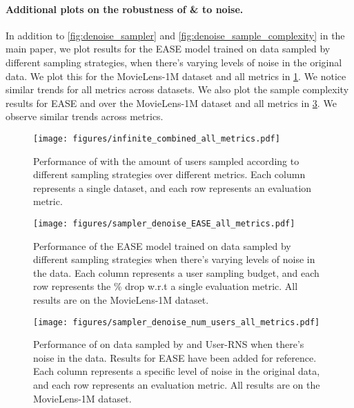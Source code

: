 \documentclass{article}
\begin{document}
\paragraph{Additional plots on the robustness of \sampler \& \model to noise.} In addition to \cref{fig:denoise_sampler} and \cref{fig:denoise_sample_complexity} in the main paper, we plot results for the EASE model trained on data sampled by different sampling strategies, when there's varying levels of noise in the original data. We plot this for the MovieLens-1M dataset and all metrics in \cref{fig:inf_ae_sampling_all_metrics}. We notice similar trends for all metrics across datasets. We also plot the sample complexity results for EASE and \model over the MovieLens-1M dataset and all metrics in \cref{fig:denoise_sample_complexity_all_metrics}. We observe similar trends across metrics.

\begin{figure}[ht!] 
    \texttt{[image: figures/infinite\_combined\_all\_metrics.pdf]}
    \caption{Performance of \model with the amount of users sampled according to different sampling strategies over different metrics. Each column represents a single dataset, and each row represents an evaluation metric.}
    \label{fig:inf_ae_sampling_all_metrics}
\end{figure}

\begin{figure}[ht!] 
    \texttt{[image: figures/sampler\_denoise\_EASE\_all\_metrics.pdf]}
    \caption{Performance of the EASE model trained on data sampled by different sampling strategies when there's varying levels of noise in the data. Each column represents a user sampling budget, and each row represents the \% drop w.r.t a single evaluation metric. All results are on the MovieLens-1M dataset.}
    \label{fig:denoise_sampler_all_metrics}
\end{figure}

\begin{figure}[ht!] 
    \texttt{[image: figures/sampler\_denoise\_num\_users\_all\_metrics.pdf]}
    \caption{Performance of \model on data sampled by \sampler and User-RNS when there's noise in the data. Results for EASE have been added for reference. Each column represents a specific level of noise in the original data, and each row represents an evaluation metric. All results are on the MovieLens-1M dataset.}
    \label{fig:denoise_sample_complexity_all_metrics}
\end{figure}
\end{document}
